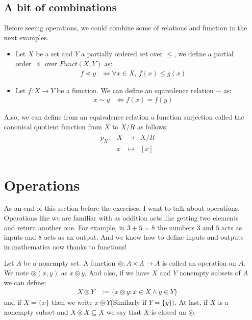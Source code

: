 \documentclass{tufte-handout}
\begin{document}
\subsection{A bit of combinations}
Before seeing operations, we could combine some of relations and function in the next examples.
\begin{itemize}
	\item Let $X$ be a set and $Y$ a partially ordered set over $\le$, we define a partial order $\preccurlyeq$ over $Funct(X, Y)$ as:
	\begin{align*}
		f \preccurlyeq g &\Longleftrightarrow \forall x \in X, \,f(x) \le g(x)
	\end{align*}

	\item Let $f: X \to Y$ be a function. We can define an equivalence relation $\sim$ as:
	\begin{align*}
		x \sim y &\Longleftrightarrow f(x) = f(y)
	\end{align*}
\end{itemize}
Also, we can define from an equivalence relation a function surjection called the canonical quotient function from $X$ to $X/R$ as follows:
\begin{align*}
	\begin{matrix}
		p_X: & X & \to & X/R\\
		& x &\mapsto & [x]
	\end{matrix}
\end{align*}

\section{Operations}
As an end of this section before the exercises, I want to talk about operations. Operations like we are familiar with as addition acts like getting two elements and return another one. For example, in $3 + 5 = 8$ the numbers $3$ and $5$ acts as inputs and $8$ acts as an output. And we know how to define inputs and outputs in mathematics now thanks to functions!

\begin{definition}[Operation]
	Let $A$ be a nonempty set. A function $\circledcirc: A \times A \to A$ is called an operation on $A$. We note $\circledcirc(x, y)$ as $x \circledcirc y$. And also, if we have $X$ and $Y$ nonempty subsets of $A$ we can define:
	\begin{align*}
		X \circledcirc Y &:= \{x \circledcirc y: x \in X \wedge y \in Y \}
	\end{align*}
	and if $X = \{x\}$ then we write $x \circledcirc Y$(Similarly if $Y = \{y\})$. At last, if $X$ is a nonempty subset and $X \circledcirc X \subseteq X$ we say that $X$ is closed un $\circledcirc$.
\end{definition}
\end{document}
